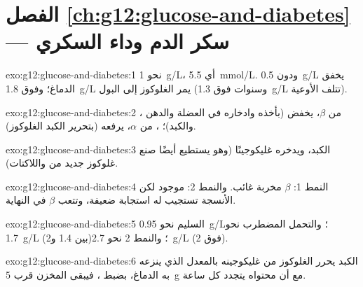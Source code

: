 \section*{الفصل \ref{ch:g12:glucose-and-diabetes} --- سكر الدم وداء السكري}

\begin{solution}{exo:g12:glucose-and-diabetes:1}
نحو \qty{1}{g/L}، أي \qty{5.5}{mmol/L}. ودون \qty{0.5}{g/L} يخفق
الدماغ؛ وفوق \qty{1.8}{g/L} يمر الغلوكوز إلى البول (وسنوات فوق
\qty{1.3}{g/L} تتلف الأوعية).
\end{solution}

\begin{solution}{exo:g12:glucose-and-diabetes:2}
، من  $\beta$، يخفض  (بأخذه وادخاره في العضلة
والدهن والكبد)؛ ، من  $\alpha$، يرفعه (بتحرير الكبد
الغلوكوز).
\end{solution}

\begin{solution}{exo:g12:glucose-and-diabetes:3}
الكبد، ويدخره غليكوجينًا (وهو يستطيع أيضًا صنع غلوكوز جديد من  واللاكتات).
\end{solution}

\begin{solution}{exo:g12:glucose-and-diabetes:4}
النمط 1:  $\beta$ مخربة  غائب. والنمط 2: 
موجود لكن الأنسجة تستجيب له استجابة ضعيفة، وتتعب  $\beta$ في
النهاية.
\end{solution}

\begin{solution}{exo:g12:glucose-and-diabetes:5}
السليم نحو \qty{0.95}{g/L}؛ والتحمل المضطرب نحو \qty{1.7}{g/L}
(بين 1.4 و2)؛ والنمط 2 نحو \qty{2.7}{g/L} (فوق 2).
\end{solution}

\begin{solution}{exo:g12:glucose-and-diabetes:6}
الكبد يحرر الغلوكوز من غليكوجينه بالمعدل الذي ينزعه به الدماغ، بضبط
، فيبقى المخزن قرب \qty{5}{g} مع أن محتواه يتجدد كل ساعة.
\end{solution}

